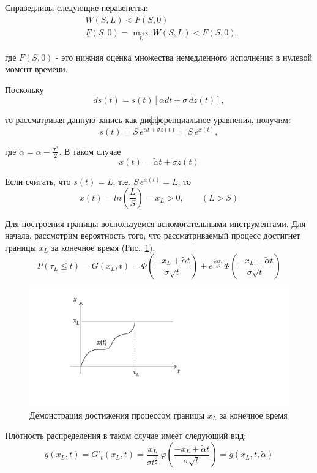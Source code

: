 \documentclass[oneside,final,12pt]{article}
\begin{document}
Справедливы следующие неравенства:
\begin{align*}
    & W(S,L) < F(S,0) \\
    & \underline{F}(S,0) = \max_L \, W(S,L) < F(S,0),
\end{align*}

\noindent
где $\underline{F}(S,0)$ - это нижняя оценка множества немедленного исполнения в нулевой момент времени.

Поскольку
$$
ds(t) = s(t)[\alpha dt + \sigma \, dz(t)],
$$

\noindent
то рассматривая данную запись как дифференциальное уравнения, получим:
$$
s(t) = S \, e^{\widetilde{\alpha}t + \sigma z(t)} = S \, e^{x(t)},
$$

\noindent
где $\widetilde{\alpha} = \alpha - \frac{\sigma^2}{2}$. В таком случае 
$$ 
x(t) = \widetilde{\alpha}t + \sigma z(t)
$$

Если считать, что $s(t) = L$, т.е. $S \, e^{x(t)}=L$, то 
$$
x(t) = ln(\frac{L}{S}) = x_L>0, \qquad (L>S)
$$

\bigskip
Для построения границы воспользуемся вспомогательными инструментами. Для начала, рассмотрим вероятность того, что рассматриваемый процесс достигнет границы $x_L$ за конечное время (Рис.~\ref{demo_xl}).
$$
   P(\tau_L \leq t) = G(x_L,t) = \Phi\left(\frac{-x_L+\widetilde{\alpha} t}{\sigma \sqrt{t}}\right) + e^{\frac{2 \widetilde{\alpha} x_L}{\sigma^2}} \Phi\left(\frac{-x_L-\widetilde{\alpha} t}{\sigma \sqrt{t}}\right)
$$

\begin{figure}
    \centering
    \includegraphics[scale=1.2]{Graph2.pdf}
    \caption{Демонстрация достижения процессом границы $x_L$ за конечное время}
    \label{demo_xl}
\end{figure}

Плотность распределения в таком случае имеет следующий вид:
$$
g(x_L,t) = G'_t(x_L,t) = \frac{x_L}{\sigma t^{\frac{3}{2}}} \, 
\varphi \left(\frac{-x_L+\widetilde{\alpha} t}{\sigma \sqrt{t}}\right) = 
g(x_L,t,\widetilde{\alpha})
$$
\end{document}
